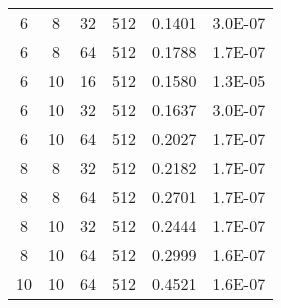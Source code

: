 \begin{table}[]
{\begin{tabular}{cccccc}
\rowcolor[HTML]{77AB59} 
6  & 8  & 32 & 512 & 0.1401 & 3.0E-07 \\
\rowcolor[HTML]{77AB59} 
6  & 8  & 64 & 512 & 0.1788 & 1.7E-07 \\
\rowcolor[HTML]{C9DF8A} 
6  & 10 & 16 & 512 & 0.1580 & 1.3E-05 \\
\rowcolor[HTML]{77AB59} 
6  & 10 & 32 & 512 & 0.1637 & 3.0E-07 \\
\rowcolor[HTML]{77AB59} 
6  & 10 & 64 & 512 & 0.2027 & 1.7E-07 \\
\rowcolor[HTML]{77AB59} 
8  & 8  & 32 & 512 & 0.2182 & 1.7E-07 \\
\rowcolor[HTML]{77AB59} 
8  & 8  & 64 & 512 & 0.2701 & 1.7E-07 \\
\rowcolor[HTML]{77AB59} 
8  & 10 & 32 & 512 & 0.2444 & 1.7E-07 \\
\rowcolor[HTML]{77AB59} 
8  & 10 & 64 & 512 & 0.2999 & 1.6E-07 \\
\rowcolor[HTML]{77AB59} 
10 & 10 & 64 & 512 & 0.4521 & 1.6E-07
\end{tabular}%
}
\end{table}